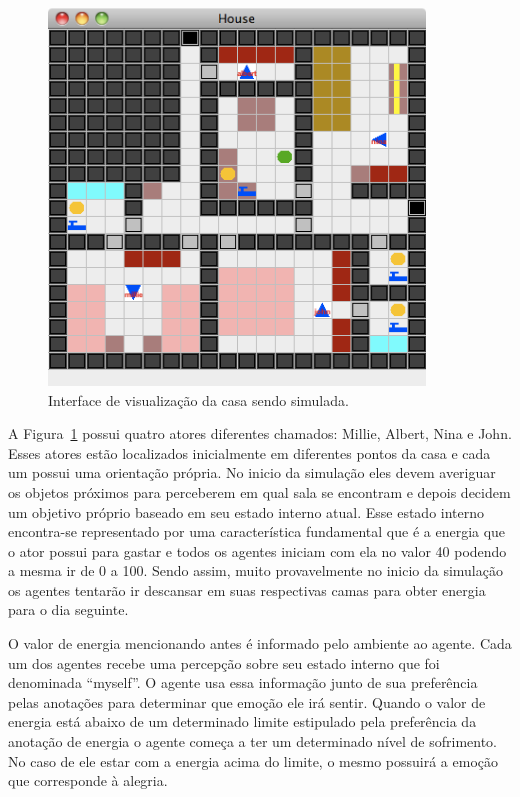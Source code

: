\begin{figure}
	\begin{center}
		\includegraphics[width=10cm]{figuras/sims.png}
	\end{center}
	\caption{Interface de visualização da casa sendo simulada.}
	\label{fig:sims}
\end{figure}

A Figura~\ref{fig:sims} possui quatro atores diferentes chamados: Millie,
Albert, Nina e John. Esses atores estão localizados inicialmente em diferentes
pontos da casa e cada um possui uma orientação própria. No inicio da simulação eles
devem averiguar os objetos próximos para perceberem em qual sala se encontram
e depois decidem um objetivo próprio baseado em seu estado interno atual.
Esse estado interno encontra-se representado por uma característica
fundamental que é a energia que o ator possui para gastar e todos os agentes
iniciam com ela no valor 40 podendo a mesma ir de 0 a 100. Sendo
assim, muito provavelmente no inicio da simulação os agentes tentarão ir
descansar em suas respectivas camas para obter energia para o dia seguinte.

O valor de energia mencionando antes é informado pelo ambiente ao
agente. Cada um dos agentes recebe uma percepção sobre seu estado
interno que foi denominada ``myself''. O agente usa essa informação junto de
sua preferência pelas anotações para determinar que emoção ele irá sentir.
Quando o valor de energia está abaixo de um determinado limite estipulado pela
preferência da anotação de energia o agente começa a ter um
determinado nível de sofrimento. No caso de ele estar com a energia acima do
limite, o mesmo possuirá a emoção que corresponde à alegria.

